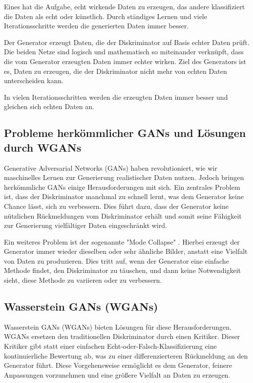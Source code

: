 \documentclass[a4paper, 12pt]{article}
\begin{document}
Eines hat die Aufgabe, echt wirkende Daten zu erzeugen, das andere klassifiziert die Daten als echt oder künstlich. Durch ständiges Lernen und viele Iterationsschritte werden die generierten Daten immer besser.\cite{youtube_gans}

Der Generator erzeugt Daten, die der Diskriminator auf Basis echter Daten prüft. Die beiden Netze sind logisch und mathematisch so miteinander verknüpft, dass die vom Generator erzeugten Daten immer echter wirken. Ziel des Generators ist es, Daten zu erzeugen, die der Diskriminator nicht mehr von echten Daten unterscheiden kann.\cite{youtube_gans}

In vielen Iterationsschritten werden die erzeugten Daten immer besser und gleichen sich echten Daten an.

\subsection{Probleme herkömmlicher GANs und Lösungen durch WGANs}
Generative Adversarial Networks (GANs) haben revolutioniert, wie wir maschinelles Lernen zur Generierung realistischer Daten nutzen. Jedoch bringen herkömmliche GANs einige Herausforderungen mit sich. Ein zentrales Problem ist, dass der Diskriminator manchmal zu schnell lernt, was dem Generator keine Chance lässt, sich zu verbessern. Dies führt dazu, dass der Generator keine nützlichen Rückmeldungen vom Diskriminator erhält und somit seine Fähigkeit zur Generierung vielfältiger Daten eingeschränkt wird\cite{mathworks_gan_training}.

Ein weiteres Problem ist der sogenannte "Mode Collapse" \cite{mathworks_gan_training}. Hierbei erzeugt der Generator immer wieder dieselben oder sehr ähnliche Bilder, anstatt eine Vielfalt von Daten zu produzieren. Dies tritt auf, wenn der Generator eine einfache Methode findet, den Diskriminator zu täuschen, und dann keine Notwendigkeit sieht, diese Methode zu variieren oder zu verbessern.


\subsection{Wasserstein GANs (WGANs)}
Wasserstein GANs (WGANs) bieten Lösungen für diese Herausforderungen\cite{ar5iv_dynamic_discriminator}\cite{ar5iv_contrastive_discriminator}. WGANs ersetzen den traditionellen Diskriminator durch einen Kritiker. Dieser Kritiker gibt statt einer einfachen Echt-oder-Falsch-Klassifizierung eine kontinuierliche Bewertung ab, was zu einer differenzierteren Rückmeldung an den Generator führt. Diese Vorgehensweise ermöglicht es dem Generator, feinere Anpassungen vorzunehmen und eine größere Vielfalt an Daten zu erzeugen.
\end{document}
